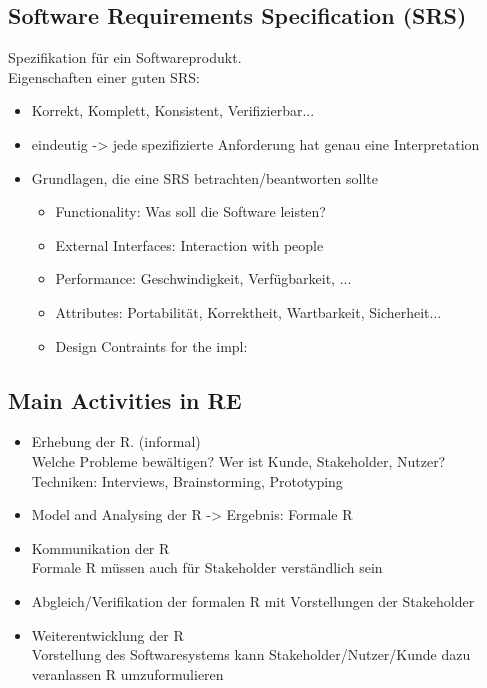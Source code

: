 \subsection{Software Requirements Specification (SRS)}
Spezifikation für ein Softwareprodukt.\\
Eigenschaften einer guten SRS:
\begin{itemize}
	\item Korrekt, Komplett, Konsistent, Verifizierbar...
	\item eindeutig -> jede spezifizierte Anforderung hat genau eine Interpretation
	\item Grundlagen, die eine SRS betrachten/beantworten sollte
	\begin{itemize}
		\item Functionality: Was soll die Software leisten?
		\item External Interfaces: Interaction with people
		\item Performance: Geschwindigkeit, Verfügbarkeit, ...
		\item Attributes: Portabilität, Korrektheit, Wartbarkeit, Sicherheit...
		\item Design Contraints for the impl:
	\end{itemize}
\end{itemize}

\subsection{Main Activities in RE}
\begin{itemize}
	\item Erhebung der R. (informal)\\
	Welche Probleme bewältigen? Wer ist Kunde, Stakeholder, Nutzer? Techniken: Interviews, Brainstorming, Prototyping
	\item Model and Analysing der R -> Ergebnis: Formale R
	\item Kommunikation der R\\
	Formale R müssen auch für Stakeholder verständlich sein
	\item Abgleich/Verifikation der formalen R mit Vorstellungen der Stakeholder
	\item Weiterentwicklung der R \\
	Vorstellung des Softwaresystems kann Stakeholder/Nutzer/Kunde dazu veranlassen R umzuformulieren
\end{itemize}